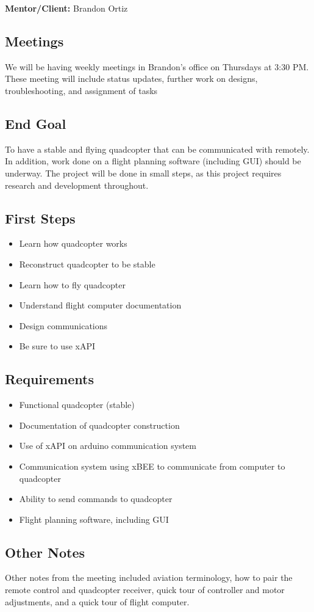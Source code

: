%
%
\textbf{Mentor/Client: }Brandon Ortiz

\subsection{Meetings}
We will be having weekly meetings in Brandon's office on Thursdays at 3:30 PM. These meeting will include status updates, further work on designs, troubleshooting, and assignment of tasks

\subsection{End Goal}
To have a stable and flying quadcopter that can be communicated with remotely. In addition, work done on a flight planning software (including GUI) should be underway. The project will be done in small steps, as this project requires research and development throughout.

\subsection{First Steps}
	\begin{itemize}
		\item Learn how quadcopter works
		\item Reconstruct quadcopter to be stable 
		\item Learn how to fly quadcopter
		\item Understand flight computer documentation
		\item Design communications
		\item Be sure to use xAPI
	\end{itemize}
	
\subsection{Requirements}
	\begin{itemize}
		\item Functional quadcopter (stable)
		\item Documentation of quadcopter construction
		\item Use of xAPI on arduino communication system
		\item Communication system using xBEE to communicate from computer to quadcopter
		\item Ability to send commands to quadcopter
		\item Flight planning software, including GUI
	\end{itemize}
	
\subsection{Other Notes}
Other notes from the meeting included aviation terminology, how to pair the remote control and quadcopter receiver, quick tour of controller and motor adjustments, and a quick tour of flight computer.
%